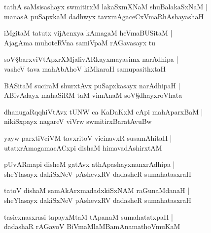 \begin{shloka}
tathA saMsisashayx swmitirxM lakaSxmXNaM shuBalakaSxNaM |\\
manasA puSapxkaM dadhwyx tavxmAgaceCxVmaRhAshayashaH
\end{shloka}

\begin{shloka}
iMgitaM tatutx vijAcnxya kAmagaM heVmaBUSitaM |\\
AjagAma muhoteRVna samiVpaM rAGavasayx tu
\end{shloka}

\begin{shloka}
soV\S barxviVtApxrXMjalivARkayxmayasimx narAdhipa |\\
vasheV tava mahAbAhoV kiMkaraH samupasithxtaH 
\end{shloka}

\begin{shloka}
BASitaM suciraM shurxtAvx puSapxkasayx narAdhipaH |\\
ABivAdayx mahaSiRM taM vimAnaM soV\S dhayxroVhata
\end{shloka}

\begin{shloka}
dhanugaRqqhiVtAvx tUNW ca KaDaKxM cApi mahAparxBaM |\\
nikiSxpayx nagareV viVrw swmitirxBaratAvuBw
\end{shloka}

\begin{shloka}
yayw parxtiVciVM tavxritoV vicinavxR susamAhitaH |\\
utatxrAmagamacACxpi dishaM himavadAshirxtAM 
\end{shloka}

\begin{shloka}
pUvARmapi disheM gatAvx athApashayxnanxrAdhipa |\\
sheYlasayx dakiSxNeV pAshevxRV dadasheR sumahatasxraH 
\end{shloka}

\begin{shloka}
tatoV dishaM samAkArxmadadxkiSxNAM raGunaMdanaH |\\
sheYlasayx dakiSxNeV pAshevxRV dadasheR sumahatasxraH
\end{shloka}

\begin{shloka}
tasicxnasxrasi tapayxMtaM tApanaM sumahatatxpaH |\\
dadashaR rAGavoV BiVmaMlaMBamAnamathoVmuKaM 
\end{shloka}

